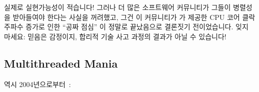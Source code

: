 실제로 실현가능성이 적습니다!
그러나 더 많은 소프트웨어 커뮤니티가 그들이 병렬성을 받아들여야 한다는 사실을
꺼려했고, 그건 이 커뮤니티가  가 제공한 CPU
코어 클락 주파수 증가로 인한 ``공짜 점심'' 이 정말로 끝났음으로 결론짓기
전이었습니다.
잊지 마세요: 믿음은 감정이지, 합리적 기술 사고 과정의 결과가 아닐 수 있습니다!

\subsection{Multithreaded Mania}
\label{sec:future:Multithreaded Mania}

역시 2004년으로부터~\cite{PaulEdwardMcKenneyPhD}:

